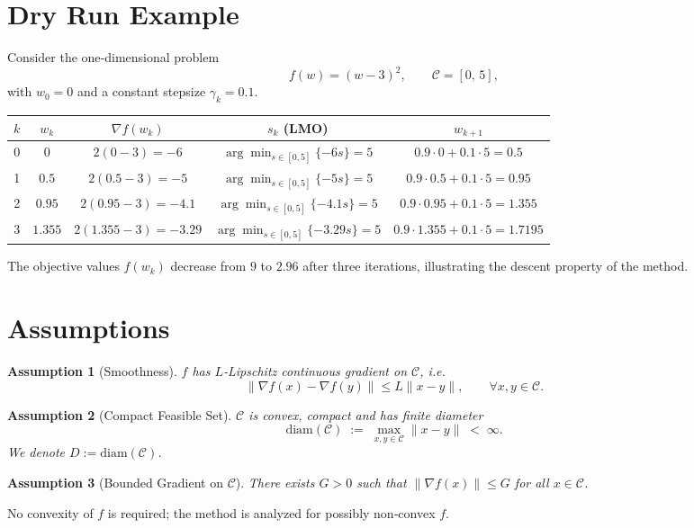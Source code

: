 \documentclass{article}
\newtheorem{assumption}{Assumption}
\newcommand{\diam}{\mathrm{diam}}
\begin{document}
\section*{Dry Run Example}
Consider the one‑dimensional problem
\[
f(w) = (w-3)^{2},\qquad \mathcal{C}=[0,\,5],
\]
with $w_{0}=0$ and a constant stepsize $\gamma_{k}=0.1$.

\begin{center}
\begin{tabular}{c|c|c|c|c}
$k$ & $w_{k}$ & $\nabla f(w_{k})$ & $s_{k}$ (LMO) & $w_{k+1}$ \\ \hline
0 & $0$ & $2(0-3)=-6$ & $\displaystyle\arg\min_{s\in[0,5]}\{-6s\}=5$ & $0.9\cdot0+0.1\cdot5=0.5$\\[4pt]
1 & $0.5$ & $2(0.5-3)=-5$ & $\displaystyle\arg\min_{s\in[0,5]}\{-5s\}=5$ & $0.9\cdot0.5+0.1\cdot5=0.95$\\[4pt]
2 & $0.95$ & $2(0.95-3)=-4.1$ & $\displaystyle\arg\min_{s\in[0,5]}\{-4.1s\}=5$ & $0.9\cdot0.95+0.1\cdot5=1.355$\\[4pt]
3 & $1.355$ & $2(1.355-3)=-3.29$ & $\displaystyle\arg\min_{s\in[0,5]}\{-3.29s\}=5$ & $0.9\cdot1.355+0.1\cdot5=1.7195$
\end{tabular}
\end{center}
The objective values $f(w_{k})$ decrease from $9$ to $2.96$ after three iterations, illustrating the descent property of the method.

\newpage
\section*{Assumptions}
\begin{assumption}[Smoothness]\label{ass:smooth}
$f$ has $L$‑Lipschitz continuous gradient on $\mathcal{C}$, i.e.
\[
\|\nabla f(x)-\nabla f(y)\|\le L\|x-y\|,\qquad\forall x,y\in\mathcal{C}.
\tag{A1}
\]
\end{assumption}
\begin{assumption}[Compact Feasible Set]\label{ass:compact}
$\mathcal{C}$ is convex, compact and has finite diameter
\[
\diam(\mathcal{C})\;:=\;\max_{x,y\in\mathcal{C}}\|x-y\|\;<\;\infty .
\tag{A2}
\]
We denote $D:=\diam(\mathcal{C})$.
\end{assumption}
\begin{assumption}[Bounded Gradient on $\mathcal{C}$]\label{ass:gradbound}
There exists $G>0$ such that $\|\nabla f(x)\|\le G$ for all $x\in\mathcal{C}$.
\end{assumption}
No convexity of $f$ is required; the method is analyzed for possibly non‑convex $f$.
\end{document}
